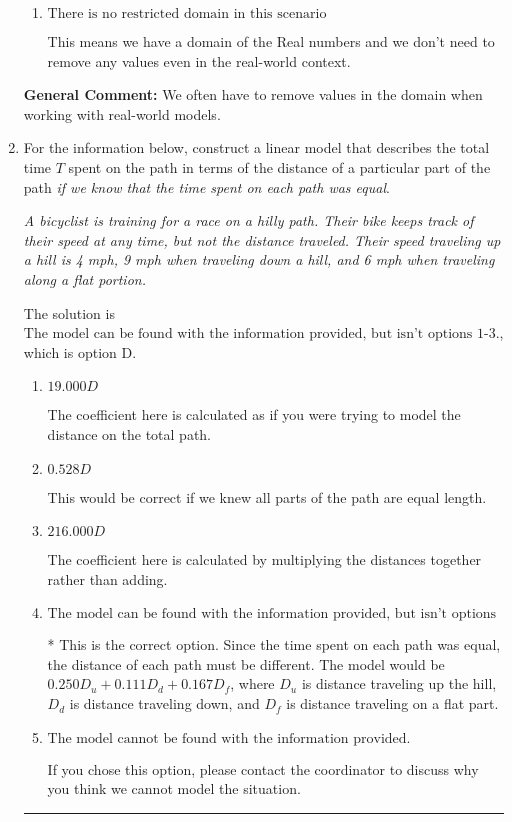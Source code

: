 \documentclass{extbook}[14pt]
\newcommand{\litem}[1]{\item #1

\rule{\textwidth}{0.4pt}}
\begin{document}
\begin{enumerate}
{\begin{enumerate}[label=\Alph*.]
Recall that the Naturals are the counting numbers: 1, 2, 3, ...
\item \( \text{There is no restricted domain in this scenario} \)

This means we have a domain of the Real numbers and we don't need to remove any values even in the real-world context.
\end{enumerate}

\textbf{General Comment:} We often have to remove values in the domain when working with real-world models.
}
\litem{
For the information below, construct a linear model that describes the total time $T$ spent on the path in terms of the distance of a particular part of the path \textit{if we know that the time spent on each path was equal}.

\begin{center}
    \textit{ A bicyclist is training for a race on a hilly path. Their bike keeps track of their speed at any time, but not the distance traveled. Their speed traveling up a hill is 4 mph, 9 mph when traveling down a hill, and 6 mph when traveling along a flat portion. }
\end{center}
The solution is \( \text{The model can be found with the information provided, but isn't options 1-3.} \), which is option D.\begin{enumerate}[label=\Alph*.]
\item \( 19.000 D \)

The coefficient here is calculated as if you were trying to model the distance on the total path.
\item \( 0.528 D \)

This would be correct if we knew all parts of the path are equal length.
\item \( 216.000 D \)

The coefficient here is calculated by multiplying the distances together rather than adding.
\item \( \text{The model can be found with the information provided, but isn't options 1-3.} \)

* This is the correct option. Since the time spent on each path was equal, the distance of each path must be different. The model would be $0.250D_u + 0.111D_d + 0.167D_f$, where $D_u$ is distance traveling up the hill, $D_d$ is distance traveling down, and $D_f$ is distance traveling on a flat part.
\item \( \text{The model cannot be found with the information provided.} \)

If you chose this option, please contact the coordinator to discuss why you think we cannot model the situation.
\end{enumerate}

}
\end{enumerate}
\end{document}
